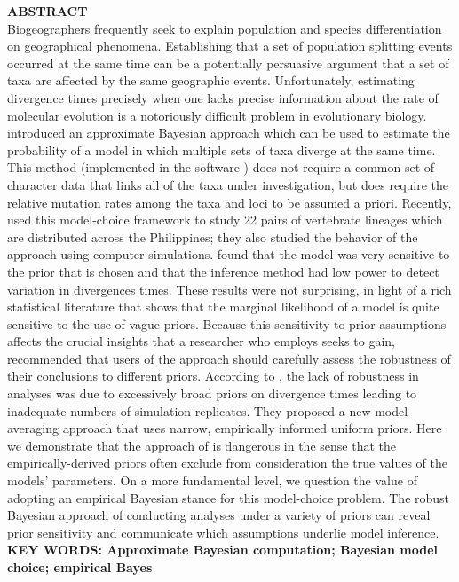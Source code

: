 \documentclass[letterpaper,12pt]{article}
\begin{document}
\begin{linenumbers}
{\sffamily
    \noindent\textbf{ABSTRACT} \\
    \noindent Biogeographers frequently seek to explain population and species
    differentiation on geographical phenomena.
    Establishing that a set of population splitting events occurred
    at the same time can be a potentially persuasive argument that a set of taxa
    are affected by the same geographic events.
    Unfortunately, estimating divergence times precisely when one lacks
    precise information about the rate of molecular evolution is a notoriously
    difficult problem in evolutionary biology.
    \citep{Huang2011} introduced an approximate Bayesian approach which can be
    used to estimate the probability of a model in which multiple sets of taxa
    diverge at the same time. 
    This method (implemented in the software \msb) does not require a common
    set of character data that links all of the taxa under investigation, but
    does require the relative mutation rates among the taxa and loci to be
    assumed a priori.
    Recently, \citet{Oaks2012} used this model-choice framework to 
    study 22 pairs of vertebrate lineages which are distributed across
    the Philippines; they also studied the behavior of the \msb approach
    using computer simulations.
    \citet{Oaks2012} found that the model was very sensitive to the 
    prior that is chosen and that the inference method had low power
    to detect variation in divergences times.
    These results were not surprising, in light of a rich statistical literature
    that shows that the marginal likelihood of a model is quite sensitive to the
    use of vague priors.
    Because this sensitivity to prior assumptions affects the crucial insights 
    that a researcher who employs \msb seeks to gain, \citet{Oaks2012} recommended
    that users of the approach should carefully assess the robustness of their 
    conclusions to different priors.
    According to \citet{Hickerson2013}, the lack of robustness in \msb analyses
    was due to excessively broad priors on divergence times leading to 
    inadequate numbers of simulation replicates.
    They proposed a new model-averaging approach that uses narrow, empirically informed uniform
    priors.
    Here we demonstrate that the approach of \citet{Hickerson2013} is
    dangerous in the sense that the empirically-derived priors often
    exclude from consideration the true values of the models' parameters.
    On a more fundamental level, we question the value of adopting an 
    empirical Bayesian stance for this model-choice problem.
    The robust Bayesian approach of conducting analyses under a variety
    of priors can reveal prior sensitivity and communicate which assumptions
    underlie model inference.
    \vspace{12pt}
    \noindent\textbf{KEY WORDS: Approximate Bayesian computation; Bayesian
        model choice; empirical Bayes} 

}
\end{linenumbers}
\end{document}
